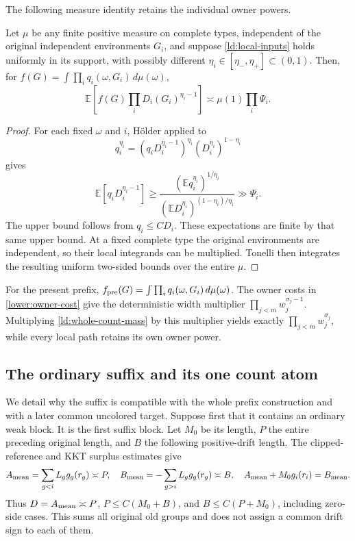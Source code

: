 The following measure identity retains the individual owner powers.
\begin{lemma}\label{ld:mixed}
Let \(\mu\) be any finite positive measure on complete types,
independent of the original independent environments \(G_i\), and
suppose \eqref{ld:local-inputs} holds uniformly in its support, with
possibly different \(\eta_i\in[\eta_-,\eta_+]\subset(0,1)\).
Then, for
\(f(G)=\int\prod_iq_i(\omega,G_i)\,d\mu(\omega)\),
\begin{equation}
 \mathbb E\left[f(G)\prod_iD_i(G_i)^{\eta_i-1}\right]
          \asymp\mu(1)\prod_i\Psi_i.
 \label{ld:mixed-result}
\end{equation}
\end{lemma}
\begin{proof}
For each fixed \(\omega\) and \(i\), H\"older applied to
\[
 q_i^{\eta_i}
  =(q_iD_i^{\eta_i-1})^{\eta_i}
                (D_i^{\eta_i})^{1-\eta_i}
\]
gives
\[
 \mathbb E[q_iD_i^{\eta_i-1}]
 \ge\frac{(\mathbb E q_i^{\eta_i})^{1/\eta_i}}
            {(\mathbb E D_i^{\eta_i})^{(1-\eta_i)/\eta_i}}
 \gg\Psi_i.
\]
The upper bound follows from \(q_i\le CD_i\).  These expectations
are finite by that same upper bound.  At a fixed complete type the
original environments are independent, so their local integrands
can be multiplied.  Tonelli then integrates the resulting uniform
two-sided bounds over the entire \(\mu\).
\end{proof}

For the present prefix,
\(f_{\rm pre}(G)=\int\prod_iq_i(\omega,G_i)\,d\mu(\omega)\).
The owner costs in \eqref{lower:owner-cost} give the deterministic
width multiplier \(\prod_{j<m}w_j^{\sigma_j-1}\).
Multiplying \eqref{ld:whole-count-mass} by this multiplier yields
exactly \(\prod_{j<m}w_j^{\sigma_j}\), while every local path
retains its own owner power.

\subsection{The ordinary suffix and its one count atom}

We detail why the suffix is compatible with the whole prefix
construction and with a later common uncolored target.  Suppose first
that it contains an ordinary weak block.  It is the first suffix
block.  Let \(M_0\) be its length, \(P\) the entire preceding
original length, and \(B\) the following positive-drift length.
The clipped-reference and KKT surplus estimates give
\begin{equation}
 A_{\rm mean}=\sum_{g<i}L_gg_g(r_g)\asymp P,\quad
 B_{\rm mean}=-\sum_{g>i}L_gg_g(r_g)\asymp B,\quad
 A_{\rm mean}+M_0g_i(r_i)=B_{\rm mean}.
 \label{ld:ordinary-balance}
\end{equation}
Thus \(D=A_{\rm mean}\asymp P\),
\(P\le C(M_0+B)\), and \(B\le C(P+M_0)\), including zero-side
cases.  This sums all original old groups and does not assign a
common drift sign to each of them.

